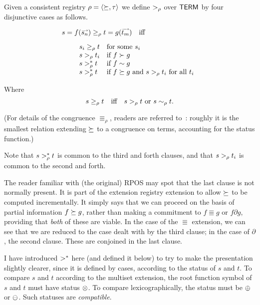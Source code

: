 \begin{defn}[$\RPOS_\rho$, $\RPOSeq_\rho$]
Given a consistent registry $\rho=\langle \succeq,\tau\rangle$ we
define $\RPOS_\rho$ over ${\sf TERM}$ by four disjunctive cases as follows.

\[\begin{array}{l}
  s=f(\vec{s_n}) \RPOSeq_\rho t=g(\vec{t_m}) \quad\mbox {iff} \\[2ex]
\qquad\begin{array}{ll}
s_i \RPOSeq_\rho t	&\mbox {for some $s_i$}		\\
s\RPOS_\rho t_i 	&\mbox {if $f\partial g$}	\\
s\RPOS_\rho^* t 	&\mbox {if $f\Equiv g$}  	\\
s\RPOS_\rho^* t		&\mbox {if $f\quasi g$ and $s\RPOS_\rho t_i$
for all $t_i$}
\end{array}\end{array}\]

Where
\[
  s\geq_\rho t \quad\mbox {iff}\quad		
	s>_\rho t \mbox{\ or\ } s\sim_\rho t.
\]
\end{defn}

(For details of the congruence $\Equiv_\rho$,
readers are referred to~\cite{Forgaard84,Steinbach94}: roughly it is
the smallest relation extending $\succeq$ to a congruence on terms,
accounting for the status function.)

Note that $s>_\rho^* t$ is common to the third and forth clauses,
and that $s>_\rho t_i$ is common to the second and forth.

The reader familiar with (the original) RPOS may spot that the last
clause is not normally present.  It is part of the extension\index
{registry extension} to allow
$\succeq$ to be computed incrementally.  It simply says that we can
proceed on the basis of partial information $f\succeq g$, rather than
making a commitment to $f\Equiv g$ or $f\partial g$, providing that
{\em both\/} of these are viable.  In the case of the $\Equiv$
extension, we can see that we are reduced to the case dealt with by
the third clause; in the case of $\partial$, the second clause.  These
are conjoined in the last clause.


\iffalse
\footnote {\clam currently does not make use of this aspect of
extensibility: see \p{prove/5}.}
\fi

I have introduced $>^*$ here (and defined it below) to try to make
the presentation slightly clearer, since it is defined by cases,
according to the status of $s$ and $t$.  To compare $s$ and $t$
according to the multiset extension, the root function symbol of $s$
and $t$ must have status $\otimes$.  To compare lexicographically, the
status must be $\oplus$ or $\ominus$.  Such statuses are {\em
compatible}.

